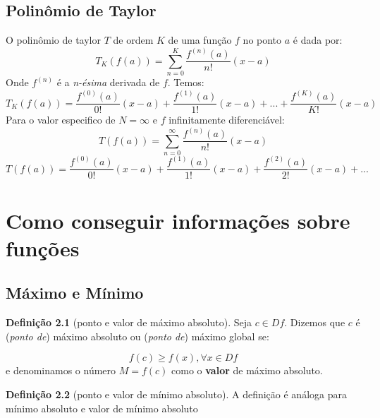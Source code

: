 \documentclass[14pt]{extreport}
\theoremstyle{definition}
\newtheorem{definition}{Definição}
\begin{document}
\section{Polinômio de Taylor}
O polinômio de taylor \(T\) de ordem \(K\) de uma função \(f\) no ponto \(a\) é dada por:
\begin{equation}
    T_K(f(a)) = \sum_{n=0}^{K} \frac{f^{(n)}(a)}{n!}(x - a)
\end{equation}
Onde \(f^{(n)}\) é a \textit{n-ésima} derivada de \(f\). Temos:
\begin{equation}
    T_K(f(a)) = \frac{f^{(0)}(a)}{0!}(x - a) +
           \frac{f^{(1)}(a)}{1!}(x - a) + ... +
           \frac{f^{(K)}(a)}{K!}(x - a)
\end{equation}
Para o valor especifico de \(N= \infty\) e \(f\) infinitamente diferenciável:
\begin{equation}
    T(f(a)) = \sum_{n=0}^{\infty} \frac{f^{(n)}(a)}{n!}(x - a)
\end{equation}
\begin{equation}
    T(f(a)) = \frac{f^{(0)}(a)}{0!}(x - a) +
           \frac{f^{(1)}(a)}{1!}(x - a) +
           \frac{f^{(2)}(a)}{2!}(x - a) + ...
\end{equation}

\chapter{Como conseguir informações sobre funções}

\section{Máximo e Mínimo}

\begin{definition}[ponto e valor de máximo absoluto]
    Seja \(c \in Df\). Dizemos que \(c\) é (\textit{ponto de}) máximo absoluto ou (\textit{ponto de}) máximo global se:
    
    \begin{equation}
        f(c) \geq f(x), \forall x \in Df
    \end{equation}
    e denominamos o número \(M = f(c)\) como o \textbf{valor} de máximo absoluto.
\end{definition}

\begin{definition}[ponto e valor de mínimo absoluto]
    A definição é análoga para mínimo absoluto e valor de mínimo absoluto
\end{definition}
\end{document}
